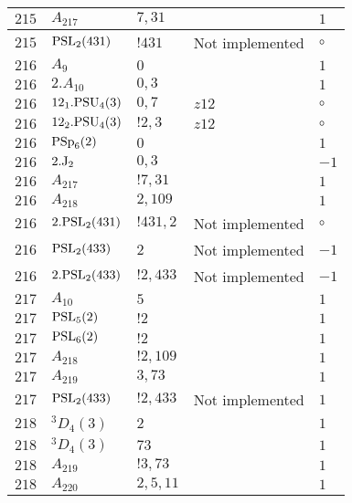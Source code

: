 \documentclass[a4paper, 11pt]{article}
\begin{document}
\begin{longtable}{lllll}
        $ 215 $ & $ A_{217} $ & $ 7, 31 $ & $ ~ $ & $ 1$ \\ \hline
        $ 215 $ & $ {\rm PSL}_{2}(431) $ & $ !431 $ &  Not implemented &  $\circ$ \\ \hline
        $ 216 $ & $ A_{9} $ & $ 0 $ & $ ~ $ & $ 1$ \\ \hline
        $ 216 $ & $ 2.A_{10} $ & $ 0,3 $ & $ ~ $ & $ 1$ \\ \hline
        $ 216 $ & $ 12_1.{\rm PSU}_{4}(3) $ & $ 0,7 $ & $ z12 $ &  $\circ$ \\ \hline
        $ 216 $ & $ 12_2.{\rm PSU}_{4}(3) $ & $ ! 2,3 $ & $ z12 $ &  $\circ$ \\ \hline
        $ 216 $ & $ {\rm PSp}_{6}(2) $ & $ 0 $ & $ ~ $ & $ 1$ \\ \hline
        $ 216 $ & $ 2.{\rm J}_2 $ & $ 0,3 $ & $ ~ $ & $ -1$ \\ \hline
        $ 216 $ & $ A_{217} $ & $ !7, 31 $ & $ ~ $ & $ 1$ \\ \hline
        $ 216 $ & $ A_{218} $ & $ 2, 109 $ & $ ~ $ & $ 1$ \\ \hline
        $ 216 $ & $ 2.{\rm PSL}_{2}(431) $ & $ !431, 2 $ &  Not implemented &  $\circ$ \\ \hline
        $ 216 $ & $ {\rm PSL}_{2}(433) $ & $ 2 $ &  Not implemented & $ -1$ \\ \hline
        $ 216 $ & $ 2.{\rm PSL}_{2}(433) $ & $ !2, 433 $ &  Not implemented & $ -1$ \\ \hline
        $ 217 $ & $ A_{10} $ & $ 5 $ & $ ~ $ & $ 1$ \\ \hline
        $ 217 $ & $ {\rm PSL}_{5}(2) $ & $ ! 2 $ & $ ~ $ & $ 1$ \\ \hline
        $ 217 $ & $ {\rm PSL}_{6}(2) $ & $ ! 2 $ & $ ~ $ & $ 1$ \\ \hline
        $ 217 $ & $ A_{218} $ & $ !2, 109 $ & $ ~ $ & $ 1$ \\ \hline
        $ 217 $ & $ A_{219} $ & $ 3, 73 $ & $ ~ $ & $ 1$ \\ \hline
        $ 217 $ & $ {\rm PSL}_{2}(433) $ & $ !2, 433 $ &  Not implemented & $ 1$ \\ \hline
        $ 218 $ & $ {}^{3}D_{4}(3) $ & $ 2 $ & $ ~ $ & $ 1$ \\ \hline
        $ 218 $ & $ {}^{3}D_{4}(3) $ & $ 73 $ & $ ~ $ & $ 1$ \\ \hline
        $ 218 $ & $ A_{219} $ & $ !3, 73 $ & $ ~ $ & $ 1$ \\ \hline
        $ 218 $ & $ A_{220} $ & $ 2, 5, 11 $ & $ ~ $ & $ 1$ \\ \hline

\end{longtable}
\end{document}
